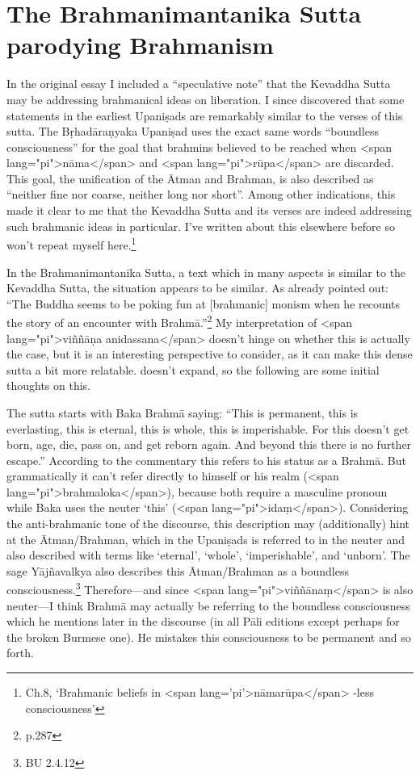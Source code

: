 \documentclass[10pt, openright]{book}
\begin{document}
\section{The Brahmanimantanika Sutta parodying Brahmanism}
In the original essay I included a “speculative note” that the Kevaddha Sutta may be addressing brahmanical ideas on liberation. I since discovered that some statements in the earliest Upaniṣads are remarkably similar to the verses of this sutta. The Bṛhadāraṇyaka Upaniṣad uses the exact same words “boundless consciousness” for the goal that brahmins believed to be reached when <span lang="pi">nāma</span> and <span lang="pi">rūpa</span> are discarded. This goal, the unification of the Ātman and Brahman, is also described as “neither fine nor coarse, neither long nor short”. Among other indications, this made it clear to me that the Kevaddha Sutta and its verses are indeed addressing such brahmanic ideas in particular. I’ve written about this elsewhere before so won’t repeat myself here.\footnote {\cite{Sunyo 2024} Ch.8, ‘Brahmanic beliefs in <span lang='pi'>nāmarūpa</span> -less consciousness’}


In the Brahmanimantanika Sutta, a text which in many aspects is similar to the Kevaddha Sutta, the situation appears to be similar. As \cite{Reat} already pointed out: “The Buddha seems to be poking fun at [brahmanic] monism when he recounts the story of an encounter with Brahmā.”\footnote {\cite{Reat} p.287} My interpretation of <span lang="pi">viññāṇa anidassana</span> doesn’t hinge on whether this is actually the case, but it is an interesting perspective to consider, as it can make this dense sutta a bit more relatable. \cite{Reat} doesn’t expand, so the following are some initial thoughts on this.


The sutta starts with Baka Brahmā saying: “This is permanent, this is everlasting, this is eternal, this is whole, this is imperishable. For this doesn’t get born, age, die, pass on, and get reborn again. And beyond this there is no further escape.” According to the commentary this refers to his status as a Brahmā. But grammatically it can’t refer directly to himself or his realm (<span lang="pi">brahma­loka</span>), because both require a masculine pronoun while Baka uses the neuter ‘this’ (<span lang="pi">idaṃ</span>). Considering the anti-brahmanic tone of the discourse, this description may (additionally) hint at the Ātman/Brahman, which in the Upaniṣads is referred to in the neuter and also described with terms like ‘eternal’, ‘whole’, ‘imperishable’, and ‘unborn’. The sage Yājñavalkya also describes this Ātman/Brahman as a boundless consciousness.\footnote {BU 2.4.12} Therefore—and since <span lang="pi">viññānaṃ</span> is also neuter—I think Brahmā may actually be referring to the boundless consciousness which he mentions later in the discourse (in all Pāli editions except perhaps for the broken Burmese one). He mistakes this consciousness to be permanent and so forth.
\end{document}
